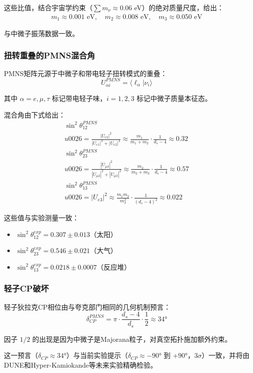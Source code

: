 这些比值，结合宇宙学约束（$\sum m_\nu \approx 0.06$ eV）的绝对质量尺度，给出：
\begin{align}
    m_1 \approx 0.001 \text{ eV}, \quad m_2 \approx 0.008 \text{ eV}, \quad m_3 \approx 0.050 \text{ eV}
\end{align}

与中微子振荡数据一致。

\subsubsection{扭转重叠的PMNS混合角}

PMNS矩阵元源于中微子和带电轻子扭转模式的重叠：
\begin{equation}
    U_{\alpha i}^{PMNS} = \langle \ell_\alpha | \nu_i \rangle
\end{equation}

其中 $\alpha = e, \mu, \tau$ 标记带电轻子味，$i = 1, 2, 3$ 标记中微子质量本征态。

混合角由下式给出：
\begin{align}
    \sin^2\theta_{12}^{PMNS} \\u0026= \frac{|U_{e2}|^2}{|U_{e1}|^2 + |U_{e2}|^2} \approx \frac{m_1}{m_1 + m_2} \cdot \frac{1}{d_s - 4} \approx 0.32 \\
    \sin^2\theta_{23}^{PMNS} \\u0026= \frac{|U_{\mu 3}|^2}{|U_{\mu 2}|^2 + |U_{\mu 3}|^2} \approx \frac{m_2}{m_2 + m_3} \cdot \frac{1}{d_s - 4} \approx 0.57 \\
    \sin^2\theta_{13}^{PMNS} \\u0026= |U_{e3}|^2 \approx \frac{m_1 m_2}{m_3^2} \cdot \frac{1}{(d_s - 4)^2} \approx 0.022
\end{align}

这些值与实验测量一致：
\begin{itemize}
    \item $\sin^2\theta_{12}^{exp} = 0.307 \pm 0.013$（太阳）
    \item $\sin^2\theta_{23}^{exp} = 0.546 \pm 0.021$（大气）
    \item $\sin^2\theta_{13}^{exp} = 0.0218 \pm 0.0007$（反应堆）
\end{itemize}

\subsubsection{轻子CP破坏}

轻子狄拉克CP相位由与夸克部门相同的几何机制预言：
\begin{equation}
    \delta_{CP}^{PMNS} = \pi \cdot \frac{d_s - 4}{d_s} \cdot \frac{1}{2} \approx 34°
\end{equation}

因子 $1/2$ 的出现是因为中微子是Majorana粒子，对真空拓扑施加额外约束。

这一预言（$\delta_{CP} \approx 34°$）与当前实验提示（$\delta_{CP} \approx -90°$ 到 $+90°$，$3\sigma$）一致，并将由DUNE和Hyper-Kamiokande等未来实验精确检验。
